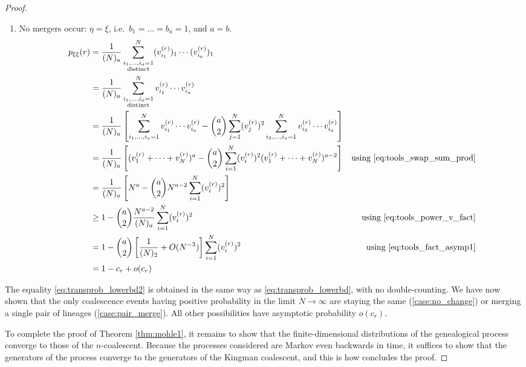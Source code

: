 \documentclass{article}
\begin{document}
\begin{proof}
\begin{enumerate}[label = \textbf{Case \arabic*.}]
\item\label{case:no_change} No mergers occur: $\eta=\xi$, i.e.\ $b_1=\dots=b_a=1$, and $a=b$.
\begin{align}
p_{\xi\xi}(r) &= \frac{1}{(N)_a} \sum_{\substack{i_1,\dots,i_a =1 \\ \text{distinct}}}^{N} (v_{i_1}^{(r)})_1  \cdots (v_{i_a}^{(r)})_1 & \notag\\
&= \frac{1}{(N)_a} \sum_{\substack{i_1,\dots,i_a =1 \\ \text{distinct}}}^{N} v_{i_1}^{(r)} \cdots v_{i_a}^{(r)} & \notag\\
&= \frac{1}{(N)_a} \left[ \sum_{i_1,\dots,i_a =1}^N v_{i_1}^{(r)} \cdots v_{i_a}^{(r)} - \binom{a}{2}\sum_{j=1}^N (v_j^{(r)})^2 \sum_{i_3,\dots,i_a =1}^N v_{i_3}^{(r)} \cdots v_{i_a}^{(r)} \right] &\label{eq:transprob_lowerbd2}\\
&= \frac{1}{(N)_a} \left[ (v_1^{(r)}+\dots+v_N^{(r)})^a - \binom{a}{2} \sum_{i=1}^N (v_i^{(r)})^2 (v_1^{(r)}+\dots+v_N^{(r)})^{a-2} \right] &\text{using \eqref{eq:tools_swap_sum_prod}} \notag\\
&= \frac{1}{(N)_a} \left[ N^a - \binom{a}{2} N^{a-2} \sum_{i=1}^N (v_i^{(r)})^2 \right] &\notag\\
&\geq 1- \binom{a}{2} \frac{N^{a-2}}{(N)_a} \sum_{i=1}^N (v_i^{(r)})^2 &\text{using \eqref{eq:tools_power_v_fact}}\notag\\
&= 1- \binom{a}{2} \left[ \frac{1}{(N)_2} + O(N^{-3}) \right] \sum_{i=1}^N (v_i^{(r)})^2 &\text{using \eqref{eq:tools_fact_asymp1}}\\
&= 1- c_r +o(c_r) &\notag
\end{align}
\end{enumerate}
The equality \eqref{eq:transprob_lowerbd2} is obtained in the same way as \eqref{eq:transprob_lowerbd}, with no double-counting.
We have now shown that the only coalescence events having positive probability in the limit $N\to\infty$ are staying the same (\ref{case:no_change}) or merging a single pair of lineages (\ref{case:pair_merge}). All other possibilities have asymptotic probability $o(c_r)$.

To complete the proof of Theorem \ref{thm:mohle1}, it remains to show that the finite-dimensional distributions of the genealogical process converge to those of the $n$-coalescent. Because the processes considered are Markov even backwards in time, it suffices to show that the generators of the process converge to the generators of the Kingman coalescent, and this is how \citet{mohle1998} concludes the proof.
\end{proof}
\end{document}
